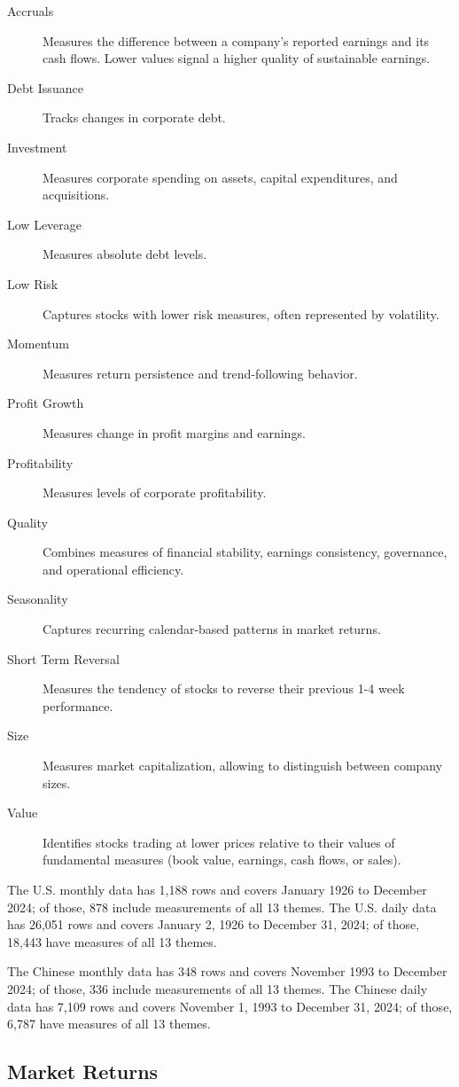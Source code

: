 \begin{description}
   \item[Accruals] Measures the difference between a company's reported earnings and its cash flows. Lower values signal a higher quality of sustainable earnings. 
   \item[Debt Issuance] Tracks changes in corporate debt.
   \item[Investment] Measures corporate spending on assets, capital expenditures, and acquisitions. 
   \item[Low Leverage] Measures absolute debt levels. 
   \item[Low Risk] Captures stocks with lower risk measures, often represented by volatility.
   \item[Momentum] Measures return persistence and trend-following behavior.
   \item[Profit Growth] Measures change in profit margins and earnings.
   \item[Profitability] Measures levels of corporate profitability.
   \item[Quality] Combines measures of financial stability, earnings consistency, governance, and operational efficiency. 
   \item[Seasonality] Captures recurring calendar-based patterns in market returns.
   \item[Short Term Reversal] Measures the tendency of stocks to reverse their previous 1-4 week performance. 
   \item[Size] Measures market capitalization, allowing to distinguish between company sizes.
   \item[Value] Identifies stocks trading at lower prices relative to their values of fundamental measures (book value, earnings, cash flows, or sales). 
\end{description}

The U.S. monthly data has 1,188 rows and covers January 1926 to December 2024; of those, 878 include measurements of all 13 themes. The U.S. daily data has 26,051 rows and covers January 2, 1926 to December 31, 2024; of those, 18,443 have measures of all 13 themes.

The Chinese monthly data has 348 rows and covers November 1993 to December 2024; of those, 336 include measurements of all 13 themes. The Chinese daily data has 7,109 rows and covers November 1, 1993 to December 31, 2024; of those, 6,787 have measures of all 13 themes.

\subsection{Market Returns}

